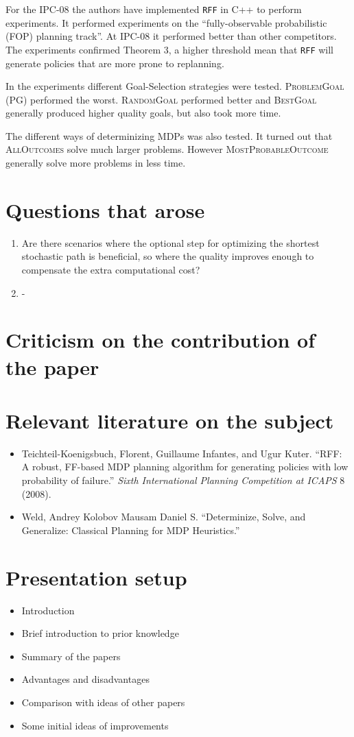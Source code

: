 \documentclass[runningheads,a4paper]{llncs}
\begin{document}
For the IPC-08 the authors have implemented \texttt{RFF} in C++ to perform
experiments. It performed experiments on the ``fully-observable probabilistic
(FOP) planning track''. At IPC-08 it performed better than other competitors.
The experiments confirmed Theorem 3, a higher threshold mean that \texttt{RFF}
will generate policies that are more prone to replanning.

In the experiments different Goal-Selection strategies were tested.
\textsc{ProblemGoal} (PG) performed the worst. \textsc{RandomGoal} performed
better and \textsc{BestGoal} generally produced higher quality goals, but also
took more time.

The different ways of determinizing MDPs was also tested. It turned out that
\textsc{AllOutcomes} solve much larger problems. However
\textsc{MostProbableOutcome} generally solve more problems in less time.

\section{Questions that arose}

\begin{enumerate}
	\item Are there scenarios where the optional step for optimizing the
		shortest stochastic path is beneficial, so where the quality
		improves enough to compensate the extra computational cost?
	\item -
\end{enumerate}

\section{Criticism on the contribution of the paper}

\section{Relevant literature on the subject}

\begin{itemize}
	\item Teichteil-Koenigsbuch, Florent, Guillaume Infantes, and Ugur Kuter. ``RFF: A robust, FF-based MDP planning algorithm for generating policies with low probability of failure.'' \emph{Sixth International Planning Competition at ICAPS} 8 (2008).
	\item Weld, Andrey Kolobov Mausam Daniel S. ``Determinize, Solve, and Generalize: Classical Planning for MDP Heuristics.''
\end{itemize}


\section{Presentation setup}

\begin{itemize}
	\item Introduction
	\item Brief introduction to prior knowledge
	\item Summary of the papers
	\item Advantages and disadvantages
	\item Comparison with ideas of other papers
	\item Some initial ideas of improvements
\end{itemize}
\end{document}

